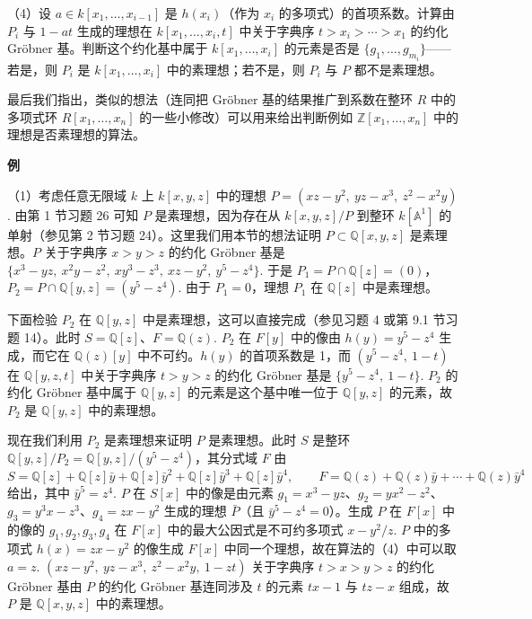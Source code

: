 （4）设 \(a \in k[x_1, \ldots, x_{i-1}]\) 是 \(h(x_i)\)（作为 \(x_i\) 的多项式）的首项系数。计算由 \(P_i\) 与 \(1-at\) 生成的理想在 \(k[x_1, \ldots, x_i, t]\) 中关于字典序 \(t > x_i > \cdots > x_1\) 的约化 Gröbner 基。判断这个约化基中属于 \(k[x_1, \ldots, x_i]\) 的元素是否是 \(\{g_1, \ldots, g_{m_i}\}\)——若是，则 \(P_i\) 是 \(k[x_1, \ldots, x_i]\) 中的素理想；若不是，则 \(P_i\) 与 \(P\) 都不是素理想。

最后我们指出，类似的想法（连同把 Gröbner 基的结果推广到系数在整环 \(R\) 中的多项式环 \(R[x_1, \ldots, x_n]\) 的一些小修改）可以用来给出判断例如 \(\mathbb{Z}[x_1, \ldots, x_n]\) 中的理想是否素理想的算法。

\noindent\textbf{例}

（1）考虑任意无限域 \(k\) 上 \(k[x,y,z]\) 中的理想 \(P = (xz-y^2,\ yz-x^3,\ z^2-x^2y)\). 由第 1 节习题 26 可知 \(P\) 是素理想，因为存在从 \(k[x,y,z]/P\) 到整环 \(k[\mathbb{A}^1]\) 的单射（参见第 2 节习题 24）。这里我们用本节的想法证明 \(P \subset \mathbb{Q}[x,y,z]\) 是素理想。\(P\) 关于字典序 \(x > y > z\) 的约化 Gröbner 基是 \(\{x^3-yz,\ x^2y-z^2,\ xy^3-z^3,\ xz-y^2,\ y^5-z^4\}\). 于是 \(P_1 = P \cap \mathbb{Q}[z] = (0)\)，\(P_2 = P \cap \mathbb{Q}[y,z] = (y^5-z^4)\). 由于 \(P_1 = 0\)，理想 \(P_1\) 在 \(\mathbb{Q}[z]\) 中是素理想。

下面检验 \(P_2\) 在 \(\mathbb{Q}[y,z]\) 中是素理想，这可以直接完成（参见习题 4 或第 9.1 节习题 14）。此时 \(S = \mathbb{Q}[z]\)、\(F = \mathbb{Q}(z)\). \(P_2\) 在 \(F[y]\) 中的像由 \(h(y) = y^5-z^4\) 生成，而它在 \(\mathbb{Q}(z)[y]\) 中不可约。\(h(y)\) 的首项系数是 1，而 \((y^5-z^4,\ 1-t)\) 在 \(\mathbb{Q}[y,z,t]\) 中关于字典序 \(t > y > z\) 的约化 Gröbner 基是 \(\{y^5-z^4,\ 1-t\}\). \(P_2\) 的约化 Gröbner 基中属于 \(\mathbb{Q}[y,z]\) 的元素是这个基中唯一位于 \(\mathbb{Q}[y,z]\) 的元素，故 \(P_2\) 是 \(\mathbb{Q}[y,z]\) 中的素理想。

现在我们利用 \(P_2\) 是素理想来证明 \(P\) 是素理想。此时 \(S\) 是整环 \(\mathbb{Q}[y,z]/P_2 = \mathbb{Q}[y,z]/(y^5-z^4)\)，其分式域 \(F\) 由
\[
S = \mathbb{Q}[z]+\mathbb{Q}[z]\bar y+\mathbb{Q}[z]\bar y^2+\mathbb{Q}[z]\bar y^3+\mathbb{Q}[z]\bar y^4, \qquad F = \mathbb{Q}(z)+\mathbb{Q}(z)\bar y+\cdots+\mathbb{Q}(z)\bar y^4
\]
给出，其中 \(\bar y^5 = z^4\). \(P\) 在 \(S[x]\) 中的像是由元素 \(g_1 = x^3-yz\)、\(g_2 = yx^2-z^2\)、\(g_3 = y^3x-z^3\)、\(g_4 = zx-y^2\) 生成的理想 \(\bar P\)（且 \(\bar y^5-z^4 = 0\)）。生成 \(P\) 在 \(F[x]\) 中的像的 \(g_1, g_2, g_3, g_4\) 在 \(F[x]\) 中的最大公因式是不可约多项式 \(x-y^2/z\). \(P\) 中的多项式 \(h(x) = zx-y^2\) 的像生成 \(F[x]\) 中同一个理想，故在算法的（4）中可以取 \(a = z\). \((xz-y^2,\ yz-x^3,\ z^2-x^2y,\ 1-zt)\) 关于字典序 \(t > x > y > z\) 的约化 Gröbner 基由 \(P\) 的约化 Gröbner 基连同涉及 \(t\) 的元素 \(tx-1\) 与 \(tz-x\) 组成，故 \(P\) 是 \(\mathbb{Q}[x,y,z]\) 中的素理想。

